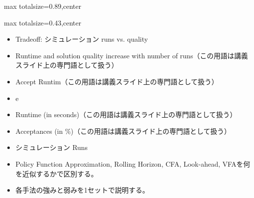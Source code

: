 \begin{minipage}[t]{0.58\textwidth}
\begin{adjustbox}{max totalsize={\textwidth}{0.89\textheight},center}
\begin{minipage}{\textwidth}
\end{minipage}
\end{adjustbox}
\end{minipage}


\clearpage
{}
\begin{minipage}[t]{0.405\textwidth}
\begin{adjustbox}{max totalsize={\textwidth}{0.43\textheight},center}
\begin{minipage}{\textwidth}\scriptsize
{}\begin{itemize}
\item Tradeoff: シミュレーション runs vs. quality
\item Runtime and solution quality increase with number of runs（この用語は講義スライド上の専門語として扱う）
\item Accept Runtim（この用語は講義スライド上の専門語として扱う）
\item e
\item Runtime (in seconds)（この用語は講義スライド上の専門語として扱う）
\item Acceptances (in \%)（この用語は講義スライド上の専門語として扱う）
\item シミュレーション Runs
\end{itemize}\begin{itemize}
\item Policy Function Approximation, Rolling Horizon, CFA, Look-ahead, VFAを何を近似するかで区別する。
\item 各手法の強みと弱みを1セットで説明する。
\end{itemize}
\end{minipage}
\end{adjustbox}
\end{minipage}\hfill
